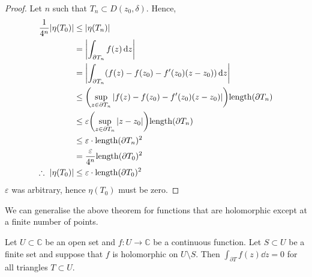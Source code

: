 \begin{proof}
	Let \( n \) such that \( T_n \subset D(z_0, \delta) \).
	Hence,
	\begin{align*}
		\frac{1}{4^n} \abs{\eta(T_0)} & \leq \abs{\eta(T_n)}                                                                                    \\
		                              & = \abs{\int_{\partial T_n} f(z) \dd{z}}                                                                 \\
		                              & = \abs{\int_{\partial T_n} (f(z) - f(z_0) - f'(z_0)(z - z_0)) \dd{z}}                                   \\
		                              & \leq \qty(\sup_{z \in \partial T_n} \abs{f(z) - f(z_0) - f'(z_0)(z-z_0)}) \mathrm{length}(\partial T_n) \\
		                              & \leq \varepsilon \qty(\sup_{z \in \partial T_n} \abs{z - z_0}) \mathrm{length}(\partial T_n)            \\
		                              & \leq \varepsilon \cdot \mathrm{length}(\partial T_n)^2                                                  \\
		                              & = \frac{\varepsilon}{4^n} \mathrm{length}(\partial T_0)^2                                               \\
		\therefore\ \abs{\eta(T_0)}    & \leq \varepsilon \cdot \mathrm{length}(\partial T_0)^2
	\end{align*}
	\( \varepsilon \) was arbitrary, hence \( \eta(T_0) \) must be zero.
\end{proof}
We can generalise the above theorem for functions that are holomorphic except at a finite number of points.
\begin{theorem}
	Let \( U \subset \mathbb C \) be an open set and \( f \colon U \to \mathbb C \) be a continuous function.
	Let \( S \subset U \) be a finite set and suppose that \( f \) is holomorphic on \( U \setminus S \).
	Then \( \int_{\partial T} f(z) \dd{z} = 0 \) for all triangles \( T \subset U \).
\end{theorem}
